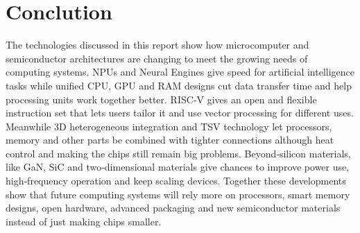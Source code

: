 \documentclass[a4paper,11pt]{article}
\begin{document}
\section{Conclution}
The technologies discussed in this report show how microcomputer and semiconductor architectures are changing to 
meet the growing needs of computing systems. NPUs and Neural Engines give speed for artificial intelligence 
tasks while unified CPU, GPU and RAM designs cut data transfer time and help processing units work together
 better. RISC‑V gives an open and flexible instruction set that lets users tailor it and use vector processing 
 for different uses. Meanwhile 3D heterogeneous integration and TSV technology let processors, memory and other 
 parts be combined with tighter connections although heat control and making the chips still remain big problems. 
 Beyond‑silicon materials, like GaN, SiC and two‑dimensional materials give chances to improve power use, 
 high‑frequency operation and keep scaling devices. Together these developments show that future computing 
 systems will rely more on processors, smart memory designs, open hardware, advanced packaging and new 
 semiconductor materials instead of just making chips smaller.

 \newpage
\printbibliography
\end{document}
